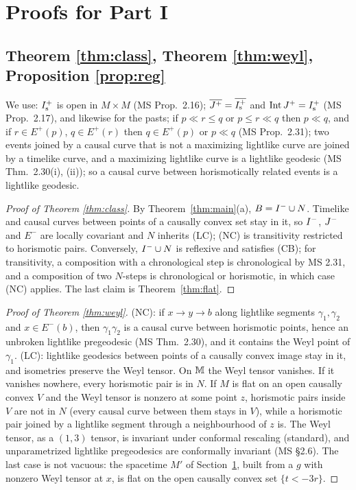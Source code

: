 \section{Proofs for Part I}\label{sec:proofs}

\subsection{Theorem \ref{thm:class}, Theorem \ref{thm:weyl}, Proposition \ref{prop:reg}}

We use: $I^{+}_{\mathrm s}$ is open in $M\times M$ (MS Prop.~2.16);
$\overline{J^{+}}=\overline{I^{+}_{\mathrm s}}$ and $\operatorname{Int}J^{+}=
I^{+}_{\mathrm s}$ (MS Prop.~2.17), and likewise for the pasts; if $p\ll r\le q$
or $p\le r\ll q$ then $p\ll q$, and if $r\in E^+(p)$, $q\in E^+(r)$ then
$q\in E^+(p)$ or $p\ll q$ (MS Prop.~2.31); two events joined by a causal
curve that is not a maximizing lightlike curve are joined by a timelike curve,
and a maximizing lightlike curve is a lightlike geodesic (MS Thm.~2.30(i),
(ii)); so a causal curve between horismotically related events is a lightlike
geodesic.

\begin{proof}[Proof of Theorem \ref{thm:class}]
By Theorem~\ref{thm:main}(a), $B=I^{-}\cup N$. Timelike and causal curves
between points of a causally convex set stay in it, so $I^{-}$, $J^{-}$ and $E^-$
are locally covariant and $N$ inherits (LC); (NC) is transitivity restricted
to horismotic pairs. Conversely, $I^{-}\cup N$ is reflexive and satisfies (CB);
for transitivity, a composition with a chronological step is chronological by
MS 2.31, and a composition of two $N$-steps is chronological or horismotic, in
which case (NC) applies. The last claim is Theorem~\ref{thm:flat}.
\end{proof}

\begin{proof}[Proof of Theorem \ref{thm:weyl}]
(NC): if $x\to y\to b$ along lightlike segments $\gamma_1,\gamma_2$ and
$x\in E^-(b)$, then $\gamma_1\gamma_2$ is a causal curve between horismotic
points, hence an unbroken lightlike pregeodesic (MS Thm.~2.30), and it
contains the Weyl point of $\gamma_1$. (LC): lightlike geodesics between points
of a causally convex image stay in it, and isometries preserve the Weyl
tensor. On $\mathbb M$ the Weyl tensor vanishes. If it vanishes nowhere, every
horismotic pair is in $N$. If $M$ is flat on an open causally convex $V$ and
the Weyl tensor is nonzero at some point $z$, horismotic pairs inside $V$ are
not in $N$ (every causal curve between them stays in $V$), while a horismotic
pair joined by a lightlike segment through a neighbourhood of $z$ is. The Weyl
tensor, as a $(1,3)$ tensor, is invariant under conformal rescaling (standard),
and unparametrized lightlike pregeodesics are conformally invariant (MS
\S2.6). The last case is not vacuous: the spacetime $M'$ of
Section~\ref{sec:proofs}, built from a $g$ with nonzero Weyl tensor at $x$, is
flat on the open causally convex set $\{t<-3r\}$.
\end{proof}

